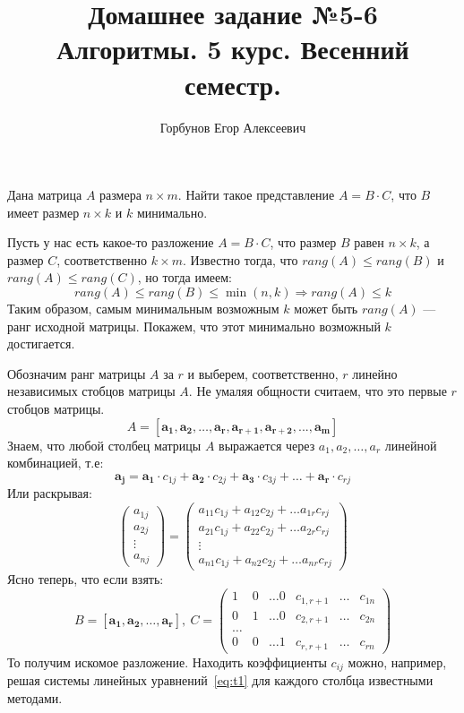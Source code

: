 
\title{Домашнее задание №5-6 \\ Алгоритмы. 5 курс. Весенний семестр.}
\author{Горбунов Егор Алексеевич}


\maketitle

\begin{task}[1]
Дана матрица $A$ размера $n \times m$. Найти такое представление $A = B \cdot C$, что $B$ имеет размер $n \times k$
и $k$ минимально.
\end{task}
\begin{solution} Пусть у нас есть какое-то разложение $A = B \cdot C$, что размер $B$ равен $n \times k$, а размер $C$, соответственно $k \times m$. Известно тогда, что $rang(A) \leqslant rang(B)$ и $rang(A) \leqslant rang(C)$, но тогда имеем:
\[
	rang(A) \leqslant rang(B) \leqslant \min{(n, k)} \Rightarrow rang(A) \leqslant k
\]
Таким образом, самым минимальным возможным $k$ может быть $rang(A)$ --- ранг исходной матрицы. Покажем, что этот минимально возможный $k$ достигается.

Обозначим ранг матрицы $A$ за $r$ и выберем, соответственно, $r$ линейно независимых стобцов матрицы $A$. Не умаляя общности считаем, что это первые $r$ стобцов матрицы.
\[
	A = \left[ \bm{a_1}, \bm{a_2}, \ldots, \bm{a_r}, \bm{a_{r+1}}, \bm{a_{r+2}}, ..., \bm{a_{m}} \right]
\]
Знаем, что любой столбец матрицы $A$ выражается через $a_1, a_2, \ldots, a_r$ линейной комбинацией, т.е:
\[
	\bm{a_j} = \bm{a_1} \cdot c_{1j} + \bm{a_2} \cdot c_{2j} + \bm{a_3} \cdot c_{3j} + \ldots + \bm{a_r} \cdot c_{rj}
\]
Или раскрывая:
\begin{equation}
\label{eq:t1}
	\begin{pmatrix}
		a_{1j}\\
		a_{2j}\\
		\vdots\\
		a_{nj} 
	\end{pmatrix}
	=
	\begin{pmatrix}
		a_{11}c_{1j} + a_{12}c_{2j} + \ldots a_{1r}c_{rj}\\
		a_{21}c_{1j} + a_{22}c_{2j} + \ldots a_{2r}c_{rj}\\
		\vdots\\
		a_{n1}c_{1j} + a_{n2}c_{2j} + \ldots a_{nr}c_{rj}

	\end{pmatrix}
\end{equation}
Ясно теперь, что если взять:
\[
	B = \left[ \bm{a_1}, \bm{a_2}, \ldots, \bm{a_r} \right],\ C = 
	\begin{pmatrix}
		1 & 0 & \ldots 0 & c_{1,{r + 1}} & \ldots & c_{1n} \\
		0 & 1 & \ldots 0 & c_{2,r + 1} & \ldots & c_{2n} \\
		\ldots \\
		0 & 0 & \ldots 1 & c_{r,r + 1} & \ldots & c_{rn}
	\end{pmatrix}
\]
То получим искомое разложение. Находить коэффициенты $c_{ij}$ можно, например, решая системы линейных уравнений~\ref{eq:t1} для каждого столбца известными методами.
\xqed
\end{solution}

